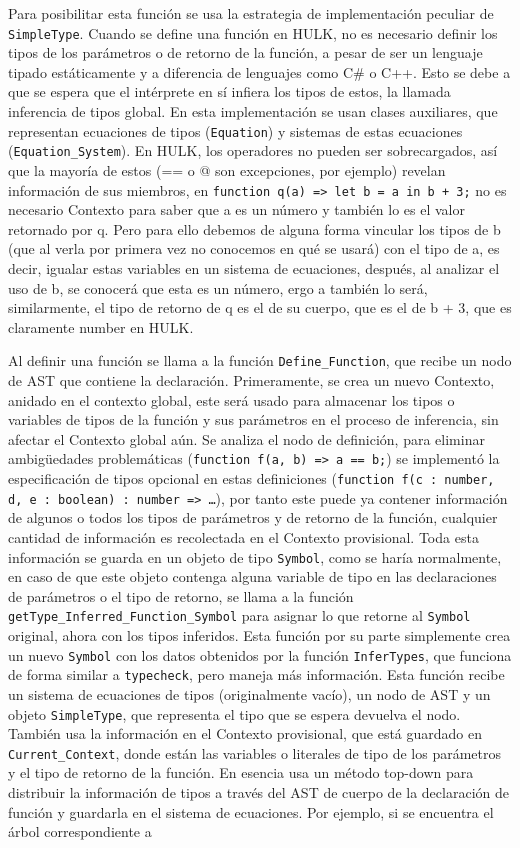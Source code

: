 \documentclass{article}
\begin{document}
Para posibilitar esta función se usa la estrategia de implementación peculiar de \texttt{SimpleType}. Cuando se define una función en HULK, no es necesario definir los tipos de los parámetros o de retorno de la función, a pesar de ser un lenguaje tipado estáticamente y a diferencia de lenguajes como C\# o C++. Esto se debe a que se espera que el intérprete en sí infiera los tipos de estos, la llamada inferencia de tipos global. En esta implementación se usan clases auxiliares, que representan ecuaciones de tipos (\texttt{Equation}) y sistemas de estas ecuaciones (\texttt{Equation\_System}). En HULK, los operadores no pueden ser sobrecargados, así que la mayoría de estos (== o @ son excepciones, por ejemplo) revelan información de sus miembros, en \texttt{function q(a) => let b = a in b + 3;} no es necesario Contexto para saber que a es un número y también lo es el valor retornado por q. Pero para ello debemos de alguna forma vincular los tipos de b (que al verla por primera vez no conocemos en qué se usará) con el tipo de a, es decir, igualar estas variables en un sistema de ecuaciones, después, al analizar el uso de b, se conocerá que esta es un número, ergo a también lo será, similarmente, el tipo de retorno de q es el de su cuerpo, que es el de b + 3, que es claramente number en HULK.

Al definir una función se llama a la función \texttt{Define\_Function}, que recibe un nodo de AST que contiene la declaración. Primeramente, se crea un nuevo Contexto, anidado en el contexto global, este será usado para almacenar los tipos o variables de tipos de la función y sus parámetros en el proceso de inferencia, sin afectar el Contexto global aún. Se analiza el nodo de definición, para eliminar ambigüedades problemáticas (\texttt{function f(a, b) => a == b;}) se implementó la especificación de tipos opcional en estas definiciones (\texttt{function f(c : number, d, e : boolean) : number => …}), por tanto este puede ya contener información de algunos o todos los tipos de parámetros y de retorno de la función, cualquier cantidad de información es recolectada en el Contexto provisional. Toda esta información se guarda en un objeto de tipo \texttt{Symbol}, como se haría normalmente, en caso de que este objeto contenga alguna variable de tipo en las declaraciones de parámetros o el tipo de retorno, se llama a la función \texttt{getType\_Inferred\_Function\_Symbol} para asignar lo que retorne al \texttt{Symbol} original, ahora con los tipos inferidos. Esta función por su parte simplemente crea un nuevo \texttt{Symbol} con los datos obtenidos por la función \texttt{InferTypes}, que funciona de forma similar a \texttt{typecheck}, pero maneja más información. Esta función recibe un sistema de ecuaciones de tipos (originalmente vacío), un nodo de AST y un objeto \texttt{SimpleType}, que representa el tipo que se espera devuelva el nodo. También usa la información en el Contexto provisional, que está guardado en \texttt{Current\_Context}, donde están las variables o literales de tipo de los parámetros y el tipo de retorno de la función. En esencia usa un método top-down para distribuir la información de tipos a través del AST de cuerpo de la declaración de función y guardarla en el sistema de ecuaciones. Por ejemplo, si se encuentra el árbol correspondiente a 
\end{document}
